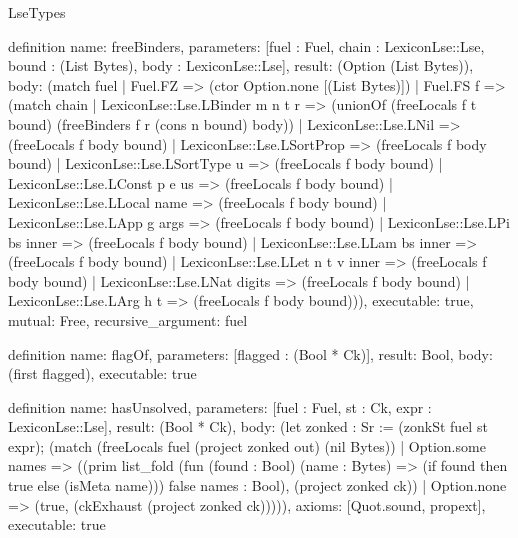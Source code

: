 \begin{lexlean}{LseTypes}
\begin{semanticmodule}
definition{
  name: freeBinders,
  parameters: [fuel : Fuel, chain : LexiconLse::Lse, bound : (List Bytes), body : LexiconLse::Lse],
  result: (Option (List Bytes)),
  body: (match fuel
    | Fuel.FZ => (ctor Option.none [(List Bytes)])
    | Fuel.FS f => (match chain
      | LexiconLse::Lse.LBinder m n t r => (unionOf (freeLocals f t bound) (freeBinders f r (cons n bound) body))
      | LexiconLse::Lse.LNil => (freeLocals f body bound)
      | LexiconLse::Lse.LSortProp => (freeLocals f body bound)
      | LexiconLse::Lse.LSortType u => (freeLocals f body bound)
      | LexiconLse::Lse.LConst p e us => (freeLocals f body bound)
      | LexiconLse::Lse.LLocal name => (freeLocals f body bound)
      | LexiconLse::Lse.LApp g args => (freeLocals f body bound)
      | LexiconLse::Lse.LPi bs inner => (freeLocals f body bound)
      | LexiconLse::Lse.LLam bs inner => (freeLocals f body bound)
      | LexiconLse::Lse.LLet n t v inner => (freeLocals f body bound)
      | LexiconLse::Lse.LNat digits => (freeLocals f body bound)
      | LexiconLse::Lse.LArg h t => (freeLocals f body bound))),
  executable: true,
  mutual: Free,
  recursive_argument: fuel
}

definition{
  name: flagOf,
  parameters: [flagged : (Bool * Ck)],
  result: Bool,
  body: (first flagged),
  executable: true
}

definition{
  name: hasUnsolved,
  parameters: [fuel : Fuel, st : Ck, expr : LexiconLse::Lse],
  result: (Bool * Ck),
  body: (let zonked : Sr := (zonkSt fuel st expr); (match (freeLocals fuel (project zonked out) (nil Bytes))
    | Option.some names => ((prim list_fold (fun (found : Bool) (name : Bytes) => (if found then true else (isMeta name))) false names : Bool), (project zonked ck))
    | Option.none => (true, (ckExhaust (project zonked ck))))),
  axioms: [Quot.sound, propext],
  executable: true
}


\end{semanticmodule}
\end{lexlean}
